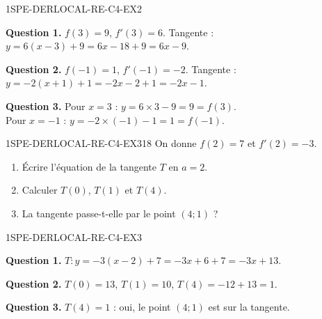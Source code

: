 
\begin{corrige}{1SPE-DERLOCAL-RE-C4-EX2}

\textbf{Question 1.}
$f(3)=9$, $f'(3)=6$. Tangente : $y = 6(x-3)+9 = 6x - 18 + 9 = 6x - 9$.

\textbf{Question 2.}
$f(-1)=1$, $f'(-1)=-2$. Tangente : $y = -2(x+1)+1 = -2x - 2 + 1 = -2x - 1$.


\textbf{Question 3.}
Pour $x=3$ : $y = 6 \times 3 - 9 = 9 = f(3)$. \checkmark \\
Pour $x=-1$ : $y = -2 \times (-1) - 1 = 1 = f(-1)$. \checkmark

\end{corrige}


\begin{exercice}{1SPE-DERLOCAL-RE-C4-EX3}{1}{8}
On donne $f(2) = 7$ et $f'(2) = -3$.
\begin{enumerate}
  \item Écrire l'équation de la tangente $T$ en $a=2$.
  \item Calculer $T(0)$, $T(1)$ et $T(4)$.
  \item La tangente passe-t-elle par le point $(4;1)$ ?
\end{enumerate}
\end{exercice}


\begin{corrige}{1SPE-DERLOCAL-RE-C4-EX3}

\textbf{Question 1.}
$T : y = -3(x-2)+7 = -3x + 6 + 7 = -3x + 13.$

\textbf{Question 2.}
$T(0) = 13$, \quad $T(1) = 10$, \quad $T(4) = -12+13 = 1$.

\textbf{Question 3.}
$T(4) = 1$ : oui, le point $(4;1)$ est sur la tangente. \checkmark

\end{corrige}

